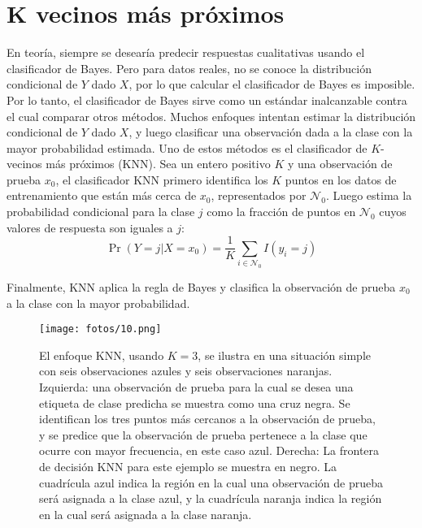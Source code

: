 \chapter{K vecinos más próximos}\label{Chapter5} 

En teoría, siempre se desearía predecir respuestas cualitativas usando el clasificador de Bayes. Pero para datos reales, no se conoce la distribución condicional de $Y$ dado $X$, por lo que calcular el clasificador de Bayes es imposible. Por lo tanto, el clasificador de Bayes sirve como un estándar inalcanzable contra el cual comparar otros métodos. Muchos enfoques intentan estimar la distribución condicional de $Y$ dado $X$, y luego clasificar una observación dada a la clase con la mayor probabilidad estimada. Uno de estos métodos es el clasificador de $K$-vecinos más próximos (KNN). Sea un entero positivo $K$ y una observación de prueba $x_0$, el clasificador KNN primero identifica los $K$ puntos en los datos de entrenamiento que están más cerca de $x_0$, representados por $\mathcal{N}_0$. Luego estima la probabilidad condicional para la clase $j$ como la fracción de puntos en $\mathcal{N}_0$ cuyos valores de respuesta son iguales a $j$:
\begin{equation}
\Pr(Y = j | X = x_0) = \frac{1}{K} \sum_{i \in \mathcal{N}_0} I(y_i = j)
\label{eq:2.12}
\end{equation}

Finalmente, KNN aplica la regla de Bayes y clasifica la observación de prueba $x_0$ a la clase con la mayor probabilidad. \\

\begin{figure}[h]
\centering
\texttt{[image: fotos/10.png]}
\caption{El enfoque KNN, usando $K = 3$, se ilustra en una situación simple con seis observaciones azules y seis observaciones naranjas. Izquierda: una observación de prueba para la cual se desea una etiqueta de clase predicha se muestra como una cruz negra. Se identifican los tres puntos más cercanos a la observación de prueba, y se predice que la observación de prueba pertenece a la clase que ocurre con mayor frecuencia, en este caso azul. Derecha: La frontera de decisión KNN para este ejemplo se muestra en negro. La cuadrícula azul indica la región en la cual una observación de prueba será asignada a la clase azul, y la cuadrícula naranja indica la región en la cual será asignada a la clase naranja.}
\label{fig:2.14}
\end{figure}

